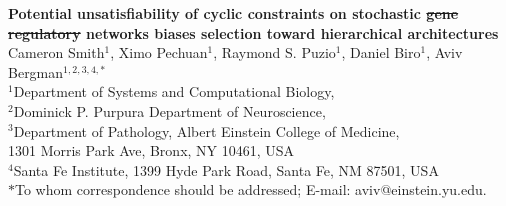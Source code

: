 \documentclass[10pt]{article}
\date{}
\providecommand{\DIFaddtex}[1]{{\protect\color{blue}\uwave{#1}}} %
\providecommand{\DIFdeltex}[1]{{\protect\color{red}\sout{#1}}}                      %
\providecommand{\DIFaddbegin}{} %
\providecommand{\DIFaddend}{} %
\providecommand{\DIFdelbegin}{} %
\providecommand{\DIFdelend}{} %
\providecommand{\DIFadd}[1]{\texorpdfstring{\DIFaddtex{#1}}{#1}} %
\providecommand{\DIFdel}[1]{\texorpdfstring{\DIFdeltex{#1}}{}} %
\begin{document}
\let\ref\autoref



\begin{center}
{\large
\textbf{Potential unsatisfiability of cyclic constraints on stochastic \DIFdelbegin \DIFdel{gene regulatory }\DIFdelend \DIFaddbegin \DIFadd{biological }\DIFaddend networks biases selection toward hierarchical architectures}
}
\\[.5cm]
Cameron Smith$^{1}$,
Ximo Pechuan$^{1}$,
Raymond S. Puzio$^{1}$,
Daniel Biro$^{1}$,
Aviv Bergman$^{1,2,3,4, \ast}$
\\[.5cm]
$^1$Department of Systems and Computational Biology,\\
$^2$Dominick P. Purpura Department of Neuroscience,\\
$^3$Department of Pathology, Albert Einstein College of Medicine,\\
1301 Morris Park Ave, Bronx, NY 10461, USA\\
$^4$Santa Fe Institute, 1399 Hyde Park Road, Santa Fe, NM 87501, USA
\\[.5cm]
$\ast$To whom correspondence should be addressed; E-mail: aviv@einstein.yu.edu.
\end{center}
\end{document}
